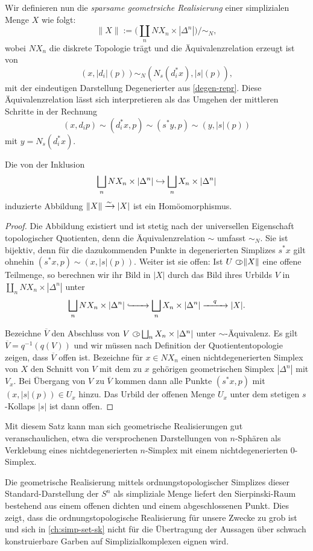Wir definieren nun die \emph{sparsame geometrsiche Realisierung} einer
simplizialen Menge $X$ wie folgt:
\[ \| X \| := \bigg( \coprod_n NX_n \times |\Delta^n| \bigg) \big/ \sim_N ,\]
wobei $NX_n$ die diskrete Topologie trägt und die Äquivalenzrelation
erzeugt ist von
\[ (x, |d_i|(p)) \sim_N (N_s(d_i^* x), |s|(p)), \]
mit der eindeutigen Darstellung Degenerierter aus
\ref{degen-repr}. Diese Äquivalenzrelation lässt sich interpretieren
als das Umgehen der mittleren Schritte in der Rechnung
\[ (x, d_i p) \sim (d_i^* x, p) \sim (s^* y, p)
   \sim (y, |s|(p)) \]
mit $y = N_s(d_i^* x)$.
   
\begin{satz}
  Die von der Inklusion
  \[ \coprod_n NX_n \times |\Delta^n| \inj \coprod_n X_n \times |\Delta^n| \]
  induzierte Abbildung $\|X\| \iso |X|$ ist ein Homöomorphismus.
\end{satz}
\begin{proof}
  Die Abbildung existiert und ist stetig nach der universellen
  Eigenschaft topologischer Quotienten, denn die Äquivalenzrelation
  $\sim$ umfasst $\sim_N$. Sie ist bijektiv, denn für die
  dazukommenden Punkte in degenerierten Simplizes $s^* x$ gilt ohnehin
  $(s^* x, p) \sim (x, |s|(p))$. Weiter ist sie offen: Ist $U \open
  \|X\|$ eine offene Teilmenge, so berechnen wir ihr Bild in $|X|$
  durch das Bild ihres Urbilds $V$ in $\coprod_n NX_n \times
  |\Delta^n|$ unter
  \[ \coprod_n NX_n \times |\Delta^n|
  \xhookrightarrow{\qquad} \coprod_n X_n \times |\Delta^n|
  \xrightarrow{\quad q \quad} |X|. \]

  Bezeichne $\overline{V}$ den Abschluss von $V \open \coprod_n X_n
  \times |\Delta^n|$ unter $\sim$-Äquivalenz. Es gilt $\overline{V} =
  q^{-1}(q(V))$ und wir müssen nach Definition der Quotiententopologie
  zeigen, dass $\overline{V}$ offen ist. Bezeichne für $x \in NX_n$
  einen nichtdegenerierten Simplex von $X$ den Schnitt von $V$ mit dem
  zu $x$ gehörigen geometrischen Simplex $|\Delta^n|$ mit $V_x$. Bei
  Übergang von $V$ zu $\overline{V}$ kommen dann alle Punkte $(s^* x,
  p)$ mit $(x, |s|(p)) \in U_x$ hinzu. Das Urbild der offenen Menge
  $U_x$ unter dem stetigen $s$-Kollaps $|s|$ ist dann offen.
\end{proof}
\begin{bem} \label{real-sphere}
  Mit diesem Satz kann man sich geometrische Realisierungen gut
  veranschaulichen, etwa die versprochenen Darstellungen von
  $n$-Sphären als Verklebung eines nichtdegenerierten $n$-Simplex mit
  einem nichtdegenerierten $0$-Simplex.
\end{bem}
\begin{bsp} \label{ex:clumsy-sphere}
  Die geometrische Realisierung mittels ordnungstopologischer
  Simplizes dieser Standard-Darstellung der $S^n$ als simpliziale
  Menge liefert den Sierpinski-Raum bestehend aus einem offenen
  dichten und einem abgeschlossenen Punkt. Dies zeigt, dass die
  ordnungstopologische Realisierung für unsere Zwecke zu grob ist und
  sich in \autoref{ch:simp-set-sk} nicht für die Übertragung der
  Aussagen über schwach konstruierbare Garben auf Simplizialkomplexen
  eignen wird.
\end{bsp}


